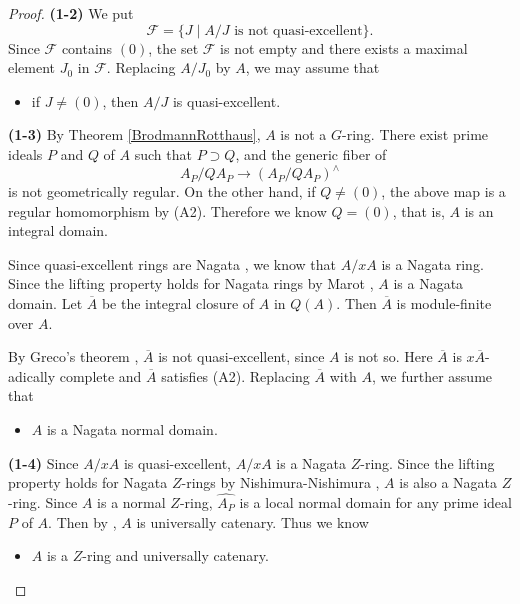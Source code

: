 \documentclass[11pt,a4paper]{amsart}
\theoremstyle{definition}
\theoremstyle{remark}
\begin{document}
\begin{proof}
\vspace{2mm}

\noindent
{\bf (1-2)}
We put
\[
{\mathcal F} = \{J \mid \mbox{$A/J$ is not quasi-excellent} \} .
\]
Since ${\mathcal F}$ contains $(0)$, the set ${\mathcal F}$ is not empty and there exists a maximal element $J_{0}$ in ${\mathcal F}$. Replacing $A/J_{0}$ by $A$, we may assume that
\begin{itemize}
\item[(A2)]
if $J \neq (0)$, then $A/J$ is quasi-excellent.
\end{itemize}

\vspace{2mm}

\noindent
{\bf (1-3)}
By Theorem \ref{BrodmannRotthaus}, $A$ is not a $G$-ring.
There exist prime ideals $P$ and $Q$ of $A$ such that
$P \supset Q$, and the generic fiber of
\[
A_{P}/QA_{P} \longrightarrow (A_{P}/QA_{P})^\wedge
\]
is not geometrically regular.
On the other hand, if $Q \neq (0)$,  the above map is a regular homomorphism by (A2). Therefore we know $Q = (0)$, that is, $A$ is an integral domain.

Since quasi-excellent rings are Nagata \cite[Theorem 78]{Ma80}, we know that $A/xA$ is a Nagata ring.
Since the lifting property holds for Nagata rings by Marot \cite{Ma75},
$A$ is a Nagata domain. Let $\overline{A}$ be the integral closure of $A$ in $Q(A)$. Then $\overline{A}$ is module-finite over $A$.

By Greco's theorem \cite[Theorem 3.1]{Gre76}, $\overline{A}$ is not quasi-excellent, since $A$ is not so. Here $\overline{A}$ is $x \overline{A}$-adically complete and $\overline{A}$ satisfies (A2). Replacing $\overline{A}$ with $A$, we further assume that 
\begin{itemize}
\item[(A3)]
$A$ is a Nagata normal domain.
\end{itemize}

\vspace{2mm}

\noindent
{\bf (1-4)}
Since $A/xA$ is quasi-excellent, $A/xA$ is a Nagata $Z$-ring.
Since the lifting property holds for Nagata $Z$-rings by 
Nishimura-Nishimura \cite[Theorem A]{Nishimura87}, $A$ is also a Nagata $Z$-ring. Since $A$ is a normal $Z$-ring, $\widehat{A_{P}}$ is a local normal domain for any prime ideal $P$ of $A$. Then by \cite[Theorem 31.6]{Ma86}, $A$ is universally catenary. Thus we know
\begin{itemize}
\item[(A4)]
$A$ is a $Z$-ring and universally catenary.
\end{itemize}


\end{proof}
\end{document}
